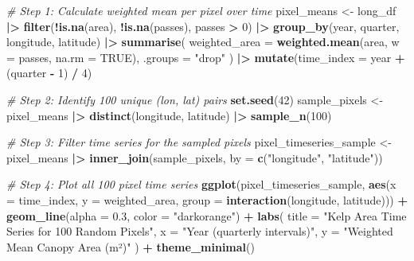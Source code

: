 \documentclass[
  british,
  10pt,
]{article}
\newenvironment{Shaded}{\begin{snugshade}}{\end{snugshade}}
\newcommand{\AttributeTok}[1]{\textcolor[rgb]{0.13,0.29,0.53}{#1}}
\newcommand{\CommentTok}[1]{\textcolor[rgb]{0.56,0.35,0.01}{\textit{#1}}}
\newcommand{\ConstantTok}[1]{\textcolor[rgb]{0.56,0.35,0.01}{#1}}
\newcommand{\DecValTok}[1]{\textcolor[rgb]{0.00,0.00,0.81}{#1}}
\newcommand{\FloatTok}[1]{\textcolor[rgb]{0.00,0.00,0.81}{#1}}
\newcommand{\FunctionTok}[1]{\textcolor[rgb]{0.13,0.29,0.53}{\textbf{#1}}}
\newcommand{\NormalTok}[1]{#1}
\newcommand{\OtherTok}[1]{\textcolor[rgb]{0.56,0.35,0.01}{#1}}
\newcommand{\SpecialCharTok}[1]{\textcolor[rgb]{0.81,0.36,0.00}{\textbf{#1}}}
\newcommand{\StringTok}[1]{\textcolor[rgb]{0.31,0.60,0.02}{#1}}
\begin{document}
\begin{Shaded}
\begin{Highlighting}[]
\CommentTok{\# Step 1: Calculate weighted mean per pixel over time}
\NormalTok{pixel\_means }\OtherTok{\textless{}{-}}\NormalTok{ long\_df }\SpecialCharTok{|\textgreater{}} 
  \FunctionTok{filter}\NormalTok{(}\SpecialCharTok{!}\FunctionTok{is.na}\NormalTok{(area), }\SpecialCharTok{!}\FunctionTok{is.na}\NormalTok{(passes), passes }\SpecialCharTok{\textgreater{}} \DecValTok{0}\NormalTok{) }\SpecialCharTok{|\textgreater{}} 
  \FunctionTok{group\_by}\NormalTok{(year, quarter, longitude, latitude) }\SpecialCharTok{|\textgreater{}} 
  \FunctionTok{summarise}\NormalTok{(}
    \AttributeTok{weighted\_area =} \FunctionTok{weighted.mean}\NormalTok{(area, }\AttributeTok{w =}\NormalTok{ passes, }\AttributeTok{na.rm =} \ConstantTok{TRUE}\NormalTok{),}
    \AttributeTok{.groups =} \StringTok{"drop"}
\NormalTok{  ) }\SpecialCharTok{|\textgreater{}} 
  \FunctionTok{mutate}\NormalTok{(}\AttributeTok{time\_index =}\NormalTok{ year }\SpecialCharTok{+}\NormalTok{ (quarter }\SpecialCharTok{{-}} \DecValTok{1}\NormalTok{) }\SpecialCharTok{/} \DecValTok{4}\NormalTok{)}

\CommentTok{\# Step 2: Identify 100 unique (lon, lat) pairs}
\FunctionTok{set.seed}\NormalTok{(}\DecValTok{42}\NormalTok{)}
\NormalTok{sample\_pixels }\OtherTok{\textless{}{-}}\NormalTok{ pixel\_means }\SpecialCharTok{|\textgreater{}} 
  \FunctionTok{distinct}\NormalTok{(longitude, latitude) }\SpecialCharTok{|\textgreater{}} 
  \FunctionTok{sample\_n}\NormalTok{(}\DecValTok{100}\NormalTok{)}

\CommentTok{\# Step 3: Filter time series for the sampled pixels}
\NormalTok{pixel\_timeseries\_sample }\OtherTok{\textless{}{-}}\NormalTok{ pixel\_means }\SpecialCharTok{|\textgreater{}} 
  \FunctionTok{inner\_join}\NormalTok{(sample\_pixels, }\AttributeTok{by =} \FunctionTok{c}\NormalTok{(}\StringTok{"longitude"}\NormalTok{, }\StringTok{"latitude"}\NormalTok{))}

\CommentTok{\# Step 4: Plot all 100 pixel time series}
\FunctionTok{ggplot}\NormalTok{(pixel\_timeseries\_sample,}
       \FunctionTok{aes}\NormalTok{(}\AttributeTok{x =}\NormalTok{ time\_index, }\AttributeTok{y =}\NormalTok{ weighted\_area,}
           \AttributeTok{group =} \FunctionTok{interaction}\NormalTok{(longitude, latitude))) }\SpecialCharTok{+}
  \FunctionTok{geom\_line}\NormalTok{(}\AttributeTok{alpha =} \FloatTok{0.3}\NormalTok{, }\AttributeTok{color =} \StringTok{"darkorange"}\NormalTok{) }\SpecialCharTok{+}
  \FunctionTok{labs}\NormalTok{(}
    \AttributeTok{title =} \StringTok{"Kelp Area Time Series for 100 Random Pixels"}\NormalTok{,}
    \AttributeTok{x =} \StringTok{"Year (quarterly intervals)"}\NormalTok{,}
    \AttributeTok{y =} \StringTok{"Weighted Mean Canopy Area (m²)"}
\NormalTok{  ) }\SpecialCharTok{+}
  \FunctionTok{theme\_minimal}\NormalTok{()}
\end{Highlighting}
\end{Shaded}
\end{document}
